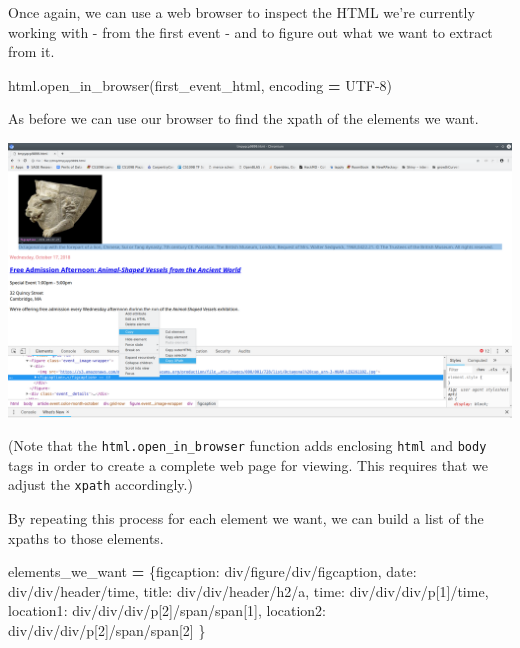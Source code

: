 \documentclass[
]{book}
\newenvironment{Shaded}{\begin{snugshade}}{\end{snugshade}}
\newcommand{\NormalTok}[1]{#1}
\newcommand{\OperatorTok}[1]{\textcolor[rgb]{0.81,0.36,0.00}{\textbf{#1}}}
\newcommand{\StringTok}[1]{\textcolor[rgb]{0.31,0.60,0.02}{#1}}
\begin{document}
Once again, we can use a web browser to inspect the HTML we're currently working with - from the first event - and to figure out what we want to extract from it.

\begin{Shaded}
\begin{Highlighting}[]
\NormalTok{html.open\_in\_browser(first\_event\_html, encoding }\OperatorTok{=} \StringTok{\textquotesingle{}UTF{-}8\textquotesingle{}}\NormalTok{)}
\end{Highlighting}
\end{Shaded}

As before we can use our browser to find the xpath of the elements we want.

\includegraphics{Python/PythonWebScrape/images/dev_tools_figcaption.png}

(Note that the \texttt{html.open\_in\_browser} function adds enclosing \texttt{html} and \texttt{body} tags in order to create a complete web page for viewing. This requires that we adjust the \texttt{xpath} accordingly.)

By repeating this process for each element we want, we can build a list of the xpaths to those elements.

\begin{Shaded}
\begin{Highlighting}[]
\NormalTok{elements\_we\_want }\OperatorTok{=}\NormalTok{ \{}\StringTok{\textquotesingle{}figcaption\textquotesingle{}}\NormalTok{: }\StringTok{\textquotesingle{}div/figure/div/figcaption\textquotesingle{}}\NormalTok{,}
                    \StringTok{\textquotesingle{}date\textquotesingle{}}\NormalTok{: }\StringTok{\textquotesingle{}div/div/header/time\textquotesingle{}}\NormalTok{,}
                    \StringTok{\textquotesingle{}title\textquotesingle{}}\NormalTok{: }\StringTok{\textquotesingle{}div/div/header/h2/a\textquotesingle{}}\NormalTok{,}
                    \StringTok{\textquotesingle{}time\textquotesingle{}}\NormalTok{: }\StringTok{\textquotesingle{}div/div/div/p[1]/time\textquotesingle{}}\NormalTok{,}
                    \StringTok{\textquotesingle{}location1\textquotesingle{}}\NormalTok{: }\StringTok{\textquotesingle{}div/div/div/p[2]/span/span[1]\textquotesingle{}}\NormalTok{,}
                    \StringTok{\textquotesingle{}location2\textquotesingle{}}\NormalTok{: }\StringTok{\textquotesingle{}div/div/div/p[2]/span/span[2]\textquotesingle{}}
\NormalTok{                    \}}
\end{Highlighting}
\end{Shaded}
\end{document}
